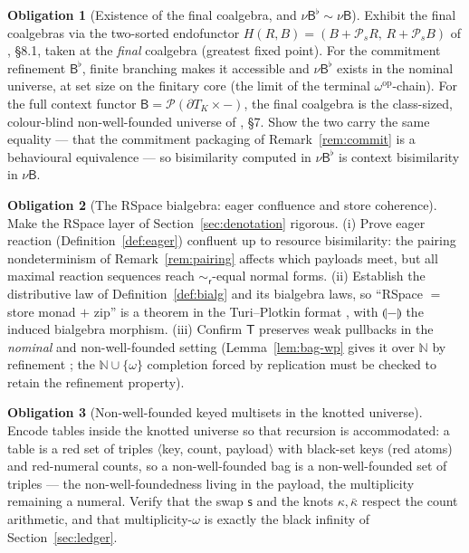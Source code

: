 \documentclass[11pt]{article}
\newcommand{\swp}{\mathsf{s}}                  %
\newcommand{\kt}{\kappa}                       %
\newcommand{\ktb}{\bar\kappa}                  %
\newcommand{\B}{\mathsf{B}}
\newcommand{\sem}[1]{\llparenthesis #1\rrparenthesis}   %
\newcommand{\bis}{\sim}
\newcommand{\DK}{\partial T_{K}}               %
\newcommand{\Tab}{\mathsf{T}}                  %
\newcommand{\resbis}{\sim_{\mathsf{r}}}        %
\theoremstyle{plain}
\theoremstyle{definition}
\newtheorem{obligation}{Obligation}
\begin{document}
\begin{obligation}[Existence of the final coalgebra, and $\nu\B^{\flat}\!\bis\nu\B$]\label{ob:exists}
Exhibit the final coalgebras via the two-sorted endofunctor
$H(R,B)=(B+\mathcal P_s R,\,R+\mathcal P_s B)$ of \cite{knot}, \S8.1, taken at the
\emph{final} coalgebra (greatest fixed point). For the commitment refinement
$\B^{\flat}$, finite branching makes it accessible and $\nu{\B^{\flat}}$ exists in
the nominal universe, at set size on the finitary core (the limit of the terminal
$\omega^{\mathrm{op}}$-chain). For the full context functor
$\B=\mathcal P(\DK\times-)$, the final coalgebra is the class-sized, colour-blind
non-well-founded universe of \cite{knot}, \S7. Show the two carry the same equality
--- that the commitment packaging of Remark~\ref{rem:commit} is a behavioural
equivalence --- so bisimilarity computed in $\nu{\B^{\flat}}$ is context
bisimilarity in $\nu\B$.
\end{obligation}

\begin{obligation}[The RSpace bialgebra: eager confluence and store coherence]\label{ob:rspace}
Make the RSpace layer of Section~\ref{sec:denotation} rigorous. (i) Prove eager
reaction (Definition~\ref{def:eager}) confluent up to resource bisimilarity: the
pairing nondeterminism of Remark~\ref{rem:pairing} affects which payloads meet, but
all maximal reaction sequences reach $\resbis$-equal normal forms. (ii) Establish
the distributive law of Definition~\ref{def:bialg} and its bialgebra laws, so
``RSpace $=$ store monad $+$ zip'' is a theorem in the Turi--Plotkin format
\cite{turiplotkin}, with $\sem{-}$ the induced bialgebra morphism. (iii) Confirm
$\Tab$ preserves weak pullbacks in the \emph{nominal} and non-well-founded setting
(Lemma~\ref{lem:bag-wp} gives it over $\mathbb N$ by refinement \cite{gummschroder};
the $\mathbb N\cup\{\omega\}$ completion forced by replication must be checked to
retain the refinement property).
\end{obligation}

\begin{obligation}[Non-well-founded keyed multisets in the knotted universe]\label{ob:nwfbag}
Encode tables inside the knotted universe so that recursion is accommodated: a
table is a red set of triples $\langle$key, count, payload$\rangle$ with black-set
keys (red atoms) and red-numeral counts, so a non-well-founded bag is a
non-well-founded set of triples --- the non-well-foundedness living in the payload,
the multiplicity remaining a numeral. Verify that the swap $\swp$ and the knots
$\kt,\ktb$ respect the count arithmetic, and that multiplicity-$\omega$ is exactly
the black infinity of Section~\ref{sec:ledger}.
\end{obligation}
\end{document}
